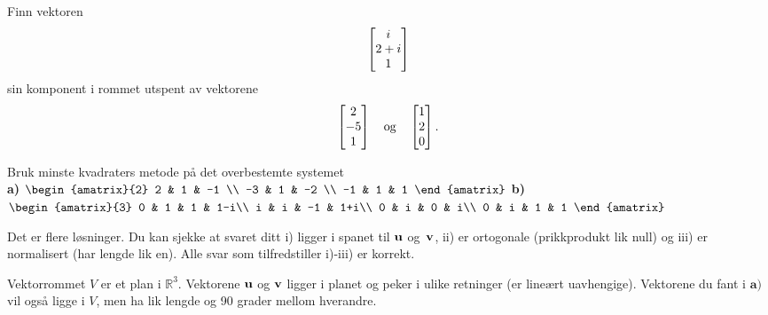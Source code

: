 \begin{oppgave}
Finn vektoren 
\[
\begin{bmatrix} i \\ 2+i \\ 1 \end{bmatrix}
\]
sin komponent i rommet utspent av vektorene 
\[
\begin{bmatrix} 2 \\ -5 \\ 1 \end{bmatrix}\quad  \text{og} \quad \begin{bmatrix} 1 \\ 2 \\ 0 \end{bmatrix}.
\]
\end{oppgave}

\begin{oppgave}
Bruk minste kvadraters metode på det overbestemte systemet \\
\textbf{a)}
$
\begin{amatrix}{2}
2 & 1 & -1 \\
-3 & 1 & -2 \\
 -1 & 1  & 1
\end{amatrix}
$
\hfill\textbf{b)}
$
\begin{amatrix}{3}
0 & 1 & 1  & 1-i\\
i & i & -1 & 1+i\\
 0 & i  & 0 & i\\
  0 & i  & 1 & 1
\end{amatrix}
$
\end{oppgave}

\begin{losning}

\begin{punkt}
Det er flere løsninger. Du kan sjekke at svaret ditt i) ligger i spanet til $\mathbf{u}$ og~$\mathbf{v}$, ii) er ortogonale (prikkprodukt lik null) og iii) er normalisert (har lengde lik en). Alle svar som tilfredstiller i)-iii) er korrekt.
\end{punkt}
\begin{punkt}
Vektorrommet $V$ er et plan i $\mathbb{R}^3$. Vektorene $\mathbf{u}$ og $\mathbf{v}$ ligger i planet og peker i ulike retninger (er lineært uavhengige). Vektorene du fant i $\textbf{a)}$ vil også ligge i $V$, men ha lik lengde og 90 grader mellom hverandre.
\end{punkt}

\end{losning}

\begin{losning}
\end{losning}

